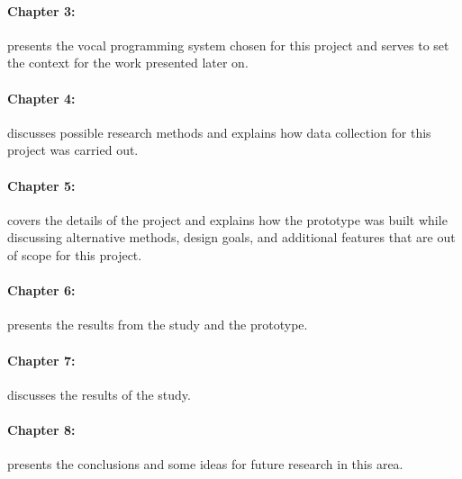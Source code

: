 \documentclass[../thesis.tex]{subfiles}
\begin{document}
\paragraph{Chapter 3: } presents the vocal programming system chosen for this project
and serves to set the context for the work presented later on.
\paragraph{Chapter 4: } discusses possible research methods and explains
how data collection for this project was carried out.
\paragraph{Chapter 5: } covers the details of the project and explains
how the prototype was built while discussing alternative methods, design goals,
and additional features that are out of scope for this project.
\paragraph{Chapter 6: } presents the results from the study and the prototype.
\paragraph{Chapter 7: } discusses the results of the study.
\paragraph{Chapter 8: } presents the conclusions and some ideas for future research in this area.
\end{document}
